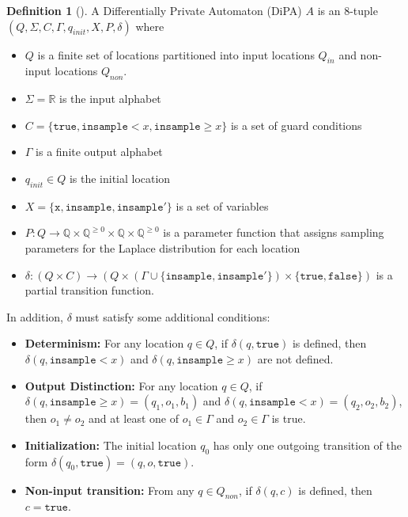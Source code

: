 \documentclass[12pt]{article}
\newcommand{\QQ}{\mathbb{Q}}
\newcommand{\RR}{\mathbb{R}}
\newcommand{\gguard}[1][x]{\texttt{insample}\geq#1}
\newcommand{\lguard}[1][x]{\texttt{insample} < #1}
\theoremstyle{definition}
\newtheorem{defn}[thm]{Definition}
\begin{document}
\begin{defn}[\cite{chadhaLinearTimeDecidability2021}]
    A Differentially Private Automaton (DiPA) $A$ is an 8-tuple $(Q, \Sigma, C, \Gamma, q_{init}, X, P, \delta)$ where
    \begin{itemize}
        \item $Q$ is a finite set of locations partitioned into input locations $Q_{in}$ and non-input locations $Q_{non}$. 
        \item $\Sigma = \RR$ is the input alphabet
        \item $C = \{\texttt{true}, \lguard, \gguard\}$ is a set of guard conditions
        \item $\Gamma$ is a finite output alphabet
        \item $q_{init}\in Q$ is the initial location
        \item $X = \{\texttt{x}, \texttt{insample}, \texttt{insample}'\}$ is a set of variables
        \item $P: Q\to \QQ\times \QQ^{\geq 0}\times \QQ\times  \QQ^{\geq 0}$ is a parameter function that assigns sampling parameters for the Laplace distribution for each location
        \item $\delta:(Q\times C)\to (Q\times (\Gamma \cup \{\texttt{insample}, \texttt{insample}'\})\times \{\texttt{true}, \texttt{false}\})$ is a partial transition function. 
    \end{itemize}
    In addition, $\delta$ must satisfy some additional conditions:
    \begin{itemize}
        \item \textbf{Determinism:} For any location $q\in Q$, if $\delta(q,\texttt{true})$ is defined, then $\delta(q,\lguard)$ and $\delta(q,\gguard)$ are not defined. 

        \item \textbf{Output Distinction:} For any location $q\in Q$, if $\delta(q, \gguard) = (q_1, o_1, b_1)$ and $\delta(q, \lguard) = (q_2, o_2, b_2)$, then $o_1\neq o_2$ and at least one of $o_1\in \Gamma$ and $o_2\in \Gamma$ is true.

        \item \textbf{Initialization:} The initial location $q_0$ has only one outgoing transition of the form $\delta(q_0, \texttt{true}) = (q, o, \texttt{true})$.

        \item \textbf{Non-input transition:} From any $q\in Q_{non}$, if $\delta(q, c)$ is defined, then $c=\texttt{true}$.
    \end{itemize}
\end{defn}
\end{document}
